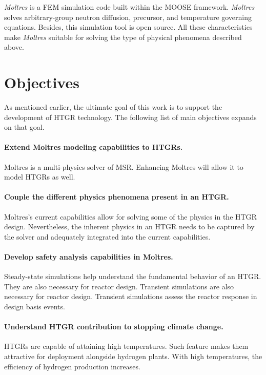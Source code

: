\textit{Moltres} \cite{lindsay_introduction_2018} is a \gls{FEM} simulation code built within the \gls{MOOSE} framework.
\textit{Moltres} solves arbitrary-group neutron diffusion, precursor, and temperature governing equations.
Besides, this simulation tool is open source.
All these characteristics make \textit{Moltres} suitable for solving the type of physical phenomena described above.

\section{Objectives}

As mentioned earlier, the ultimate goal of this work is to support the development of \gls{HTGR} technology.
The following list of main objectives expands on that goal.

\paragraph{Extend Moltres modeling capabilities to \glspl{HTGR}.}
Moltres is a multi-physics solver of \gls{MSR}.
Enhancing Moltres will allow it to model \glspl{HTGR} as well.

\paragraph{Couple the different physics phenomena present in an \gls{HTGR}.}
Moltres's current capabilities allow for solving some of the physics in the \gls{HTGR} design.
Nevertheless, the inherent physics in an \gls{HTGR} needs to be captured by the solver and adequately integrated into the current capabilities.

\paragraph{Develop safety analysis capabilities in Moltres.}
Steady-state simulations help understand the fundamental behavior of an \gls{HTGR}.
They are also necessary for reactor design.
Transient simulations are also necessary for reactor design.
Transient simulations assess the reactor response in design basis events.

\paragraph{Understand \gls{HTGR} contribution to stopping climate change.}
\glspl{HTGR} are capable of attaining high temperatures.
Such feature makes them attractive for deployment alongside hydrogen plants. 
With high temperatures, the efficiency of hydrogen production increases.

